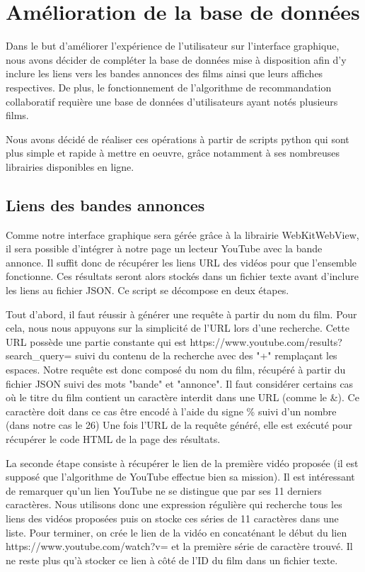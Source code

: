 \section{Amélioration de la base de données}
Dans le but d'améliorer l'expérience de l'utilisateur sur l'interface graphique, nous avons décider de compléter la base de données mise à disposition afin d'y inclure les liens vers les bandes annonces des films ainsi que leurs affiches respectives.
De plus, le fonctionnement de l'algorithme de recommandation collaboratif requière une base de données d'utilisateurs ayant notés plusieurs films.
\par Nous avons décidé de réaliser ces opérations à partir de scripts python qui sont plus simple et rapide à mettre en oeuvre, grâce notamment à ses nombreuses librairies disponibles en ligne.

\subsection{Liens des bandes annonces}
Comme notre interface graphique sera gérée grâce à la librairie WebKitWebView, il sera possible d'intégrer à notre page un lecteur YouTube avec la bande annonce.
Il suffit donc de récupérer les liens URL des vidéos pour que l'ensemble fonctionne. Ces résultats seront alors stockés dans un fichier texte avant d'inclure les liens au fichier JSON.
\vspace{0.5cm}
Ce script se décompose en deux étapes.\par
Tout d'abord, il faut réussir à générer une requête à partir du nom du film. Pour cela, nous nous appuyons sur la simplicité de l'URL lors d'une recherche. Cette URL possède une partie constante qui est \newline https://www.youtube.com/results?search\_query=
suivi du contenu de la recherche avec des "+" remplaçant les espaces.
Notre requête est donc composé du nom du film, récupéré à partir du fichier JSON suivi des mots "bande" et "annonce". Il faut considérer certains cas où le titre du film contient un caractère interdit dans une URL (comme le \&). Ce caractère doit dans ce cas être encodé à l'aide du signe \% suivi d'un nombre (dans notre cas le 26)
Une fois l'URL de la requête généré, elle est exécuté pour récupérer le code HTML de la page des résultats.\par
La seconde étape consiste à récupérer le lien de la première vidéo proposée (il est supposé que l'algorithme de YouTube effectue bien sa mission). Il est intéressant de remarquer qu'un lien YouTube ne se distingue que par ses 11 derniers caractères. Nous utilisons donc une expression régulière qui recherche tous les liens des vidéos proposées puis on stocke ces séries de 11 caractères dans une liste.
Pour terminer, on crée le lien de la vidéo en concaténant le début du lien https://www.youtube.com/watch?v= et la première série de caractère trouvé. Il ne reste plus qu'à stocker ce lien à côté de l'ID du film dans un fichier texte.

